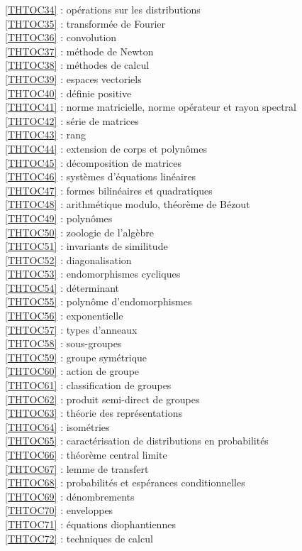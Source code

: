 \ref {THTOC34} : opérations sur les distributions\\
\ref {THTOC35} : transformée de Fourier\\
\ref {THTOC36} : convolution\\
\ref {THTOC37} : méthode de Newton\\
\ref {THTOC38} : méthodes de calcul\\
\ref {THTOC39} : espaces vectoriels\\
\ref {THTOC40} : définie positive\\
\ref {THTOC41} : norme matricielle, norme opérateur et rayon spectral\\
\ref {THTOC42} : série de matrices\\
\ref {THTOC43} : rang\\
\ref {THTOC44} : extension de corps et polynômes\\
\ref {THTOC45} : décomposition de matrices\\
\ref {THTOC46} : systèmes d'équations linéaires\\
\ref {THTOC47} : formes bilinéaires et quadratiques\\
\ref {THTOC48} : arithmétique modulo, théorème de Bézout\\
\ref {THTOC49} : polynômes\\
\ref {THTOC50} : zoologie de l'algèbre\\
\ref {THTOC51} : invariants de similitude\\
\ref {THTOC52} : diagonalisation\\
\ref {THTOC53} : endomorphismes cycliques\\
\ref {THTOC54} : déterminant\\
\ref {THTOC55} : polynôme d'endomorphismes\\
\ref {THTOC56} : exponentielle\\
\ref {THTOC57} : types d'anneaux\\
\ref {THTOC58} : sous-groupes\\
\ref {THTOC59} : groupe symétrique\\
\ref {THTOC60} : action de groupe\\
\ref {THTOC61} : classification de groupes\\
\ref {THTOC62} : produit semi-direct de groupes\\
\ref {THTOC63} : théorie des représentations\\
\ref {THTOC64} : isométries\\
\ref {THTOC65} : caractérisation de distributions en probabilités\\
\ref {THTOC66} : théorème central limite\\
\ref {THTOC67} : lemme de transfert\\
\ref {THTOC68} : probabilités et espérances conditionnelles\\
\ref {THTOC69} : dénombrements\\
\ref {THTOC70} : enveloppes\\
\ref {THTOC71} : équations diophantiennes\\
\ref {THTOC72} : techniques de calcul\\
